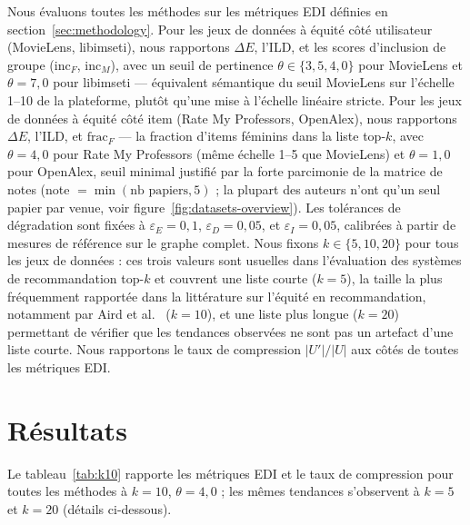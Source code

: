 \documentclass[12pt]{report}
\begin{document}
Nous évaluons toutes les méthodes sur les métriques EDI définies en
section~\ref{sec:methodology}. Pour les jeux de données à équité côté
utilisateur (MovieLens, libimseti), nous rapportons $\Delta E$, l'ILD, et
les scores d'inclusion de groupe ($\mathrm{inc}_F$, $\mathrm{inc}_M$),
avec un seuil de pertinence $\theta \in \{3{,}5, 4{,}0\}$ pour MovieLens
et $\theta = 7{,}0$ pour libimseti ---
équivalent sémantique du seuil MovieLens sur l'échelle 1--10 de la
plateforme, plutôt qu'une mise à l'échelle linéaire stricte. Pour les
jeux de données à équité côté item (Rate My Professors, OpenAlex), nous
rapportons $\Delta E$, l'ILD, et $\mathrm{frac}_F$ --- la fraction
d'items féminins dans la liste top-$k$, avec $\theta = 4{,}0$ pour Rate
My Professors (même échelle 1--5 que MovieLens) et $\theta = 1{,}0$ pour
OpenAlex, seuil minimal justifié par la forte parcimonie de la matrice
de notes (note $= \min(\text{nb papiers}, 5)$ ; la plupart des auteurs
n'ont qu'un seul papier par venue, voir figure~\ref{fig:datasets-overview}).
Les tolérances de
dégradation sont fixées à $\varepsilon_E = 0{,}1$, $\varepsilon_D =
0{,}05$, et $\varepsilon_I = 0{,}05$, calibrées à partir de mesures de
référence sur le graphe complet. Nous fixons $k \in \{5, 10, 20\}$ pour
tous les jeux de données : ces trois valeurs sont usuelles dans
l'évaluation des systèmes de recommandation top-$k$ et couvrent une
liste courte ($k=5$), la taille la plus fréquemment rapportée dans la
littérature sur l'équité en recommandation, notamment par Aird et
al.~\cite{aird_exploring_2023} ($k=10$), et une liste plus longue ($k=20$)
permettant de vérifier que les tendances observées ne sont pas un
artefact d'une liste courte. Nous rapportons le taux de compression
$|U'|/|U|$ aux côtés de toutes les métriques EDI.

\section{Résultats}

Le tableau~\ref{tab:k10} rapporte les métriques EDI et le taux de
compression pour toutes les méthodes à $k=10$, $\theta=4{,}0$ ; les
mêmes tendances s'observent à $k=5$ et $k=20$ (détails ci-dessous).
\end{document}
